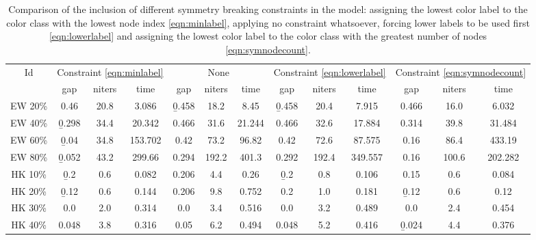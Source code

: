 \begin{table}
\label{table:models:sym}
\centering

\begin{tabular}{|c|ccc|ccc|ccc|ccc|}
\hline
\multicolumn{1}{|c|}{Id} & \multicolumn{3}{|c|}{Constraint \ref{eqn:minlabel}} & \multicolumn{3}{|c|}{None} & \multicolumn{3}{|c|}{Constraint \ref{eqn:lowerlabel}} & \multicolumn{3}{|c|}{Constraint \ref{eqn:symnodecount}}
\\
 & gap & niters & time & gap & niters & time & gap & niters & time & gap & niters & time
\\
\hline
EW 20\% & 0.46 & 20.8 & 3.086 & \b{0.458} & 18.2 & 8.45 & \b{0.458} & 20.4 & 7.915 & 0.466 & 16.0 & 6.032
\\
EW 40\% & \b{0.298} & 34.4 & 20.342 & 0.466 & 31.6 & 21.244 & 0.466 & 32.6 & 17.884 & 0.314 & 39.8 & 31.484
\\
EW 60\% & \b{0.04} & 34.8 & 153.702 & 0.42 & 73.2 & 96.82 & 0.42 & 72.6 & 87.575 & 0.16 & 86.4 & 433.19
\\
EW 80\% & \b{0.052} & 43.2 & 299.66 & 0.294 & 192.2 & 401.3 & 0.292 & 192.4 & 349.557 & 0.16 & 100.6 & 202.282
\\
\hline
HK 10\% &  \b{0.2} &  0.6 & 0.082 & 0.206 &  4.4 & 0.26 &  \b{0.2} &  0.8 & 0.106 & 0.15 &  0.6 & 0.084
\\
HK 20\% & \b{0.12} &  0.6 & 0.144 & 0.206 &  9.8 & 0.752 &  0.2 &  1.0 & 0.181 & \b{0.12} &  0.6 & 0.12
\\
HK 30\% &  0.0 &  2.0 & 0.314 &  0.0 &  3.4 & 0.516 &  0.0 &  3.2 & 0.489 &  0.0 &  2.4 & 0.454
\\
HK 40\% & 0.048 &  3.8 & 0.316 & 0.05 &  6.2 & 0.494 & 0.048 &  5.2 & 0.416 & \b{0.024} &  4.4 & 0.376
\\
\hline 
 \end{tabular}

\caption{Comparison of the inclusion of different symmetry breaking constraints in the model: assigning the lowest color label to the color class with the lowest node index \eqref{eqn:minlabel}, applying no constraint whatsoever, forcing lower labels to be used first \eqref{eqn:lowerlabel} and assigning the lowest color label to the color class with the greatest number of nodes \eqref{eqn:symnodecount}.}

\end{table}

